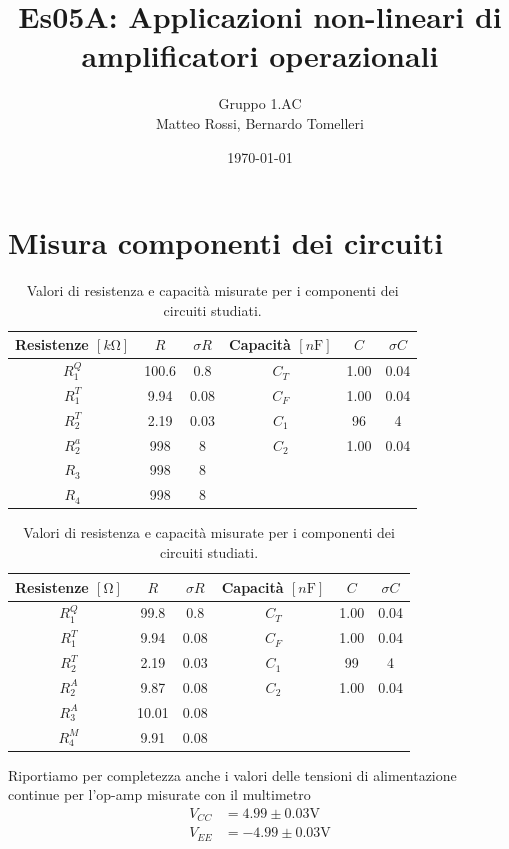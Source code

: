 \documentclass[10pt,a4paper]{article}
\author{Gruppo 1.AC \\ Matteo Rossi, Bernardo Tomelleri}
\title{Es05A: Applicazioni non-lineari di amplificatori operazionali}
\begin{document}
\date{\today}
\maketitle

\setcounter{section}{0}

\section*{Misura componenti dei circuiti}
\begin{table}[htbp]
\centering
\begin{tabular}{cccccc}
\toprule
Resistenze $[\si{k\ohm}]$ & $R$ & $\sigma R$ & Capacità $[\si{n\F}]$ & $C$ &
$\sigma C$ \\
\midrule
\midrule
$R_1^Q$	  & 100.6 	& 0.8 	 & $C_T$ & 1.00		 & 0.04 \\
$R_1^T$	  & 9.94	& 0.08 	 & $C_F$ & 1.00		 & 0.04 \\
$R_2^T$	  & 2.19	& 0.03	 & $C_1$ & 96		 & 4	\\
$R_2^a$	  & 998		& 8		 & $C_2$ & 1.00		 & 0.04 \\
$R_3$	  & 998		& 8		 & & & \\
$R_4$	  & 998		& 8		 & & & \\
\bottomrule     
\end{tabular}
\caption{Valori di resistenza e capacità misurate per i componenti dei
circuiti studiati. \label{tab: rcmes_B}}

\begin{tabular}{cccccc}
\toprule
Resistenze $[\si{\ohm}]$ & $R$ & $\sigma R$ & Capacità $[\si{n\F}]$ & $C$ &
$\sigma C$ \\
\midrule
\midrule
$R_1^Q$	  & 99.8 	& 0.8 	 & $C_T$ & 1.00		 & 0.04 \\
$R_1^T$	  & 9.94	& 0.08 	 & $C_F$ & 1.00		 & 0.04 \\
$R_2^T$	  & 2.19	& 0.03	 & $C_1$ & 99		 & 4	\\
$R_2^A$	  & 9.87		& 0.08		 & $C_2$ & 1.00		 & 0.04 \\
$R_3^A$	  & 10.01		& 0.08		 & & & \\
$R_4^M$	  & 9.91		& 0.08		 & & & \\
\bottomrule     
\end{tabular}
\caption{Valori di resistenza e capacità misurate per i componenti dei
circuiti studiati. \label{tab: rcmes_M}}
\end{table}

Riportiamo per completezza anche i valori delle tensioni di alimentazione
continue per l'op-amp misurate con il multimetro
\begin{align*}
V_{CC} &= 4.99 \pm 0.03 \si{\V} \\
V_{EE} &= -4.99 \pm 0.03 \si{\V}
\end{align*}
\end{document}
